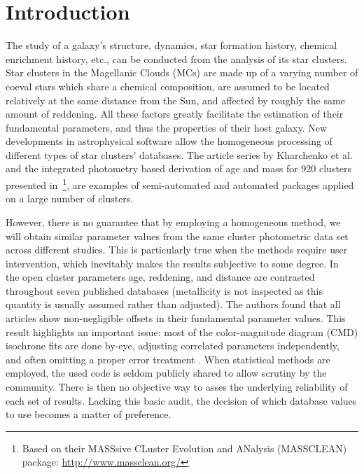 \documentclass{aa}
\begin{document}

\maketitle
%

\section{Introduction}
\label{sec:intro}

The study of a galaxy's structure, dynamics, star formation history, chemical
enrichment history, etc., can be conducted from the analysis of its star
clusters.
Star clusters in the Magellanic Clouds (MCs) are made up of a varying number of
coeval stars which share a chemical composition, are assumed to be located
relatively at the same distance from the Sun, and affected by roughly the same
amount of reddening. All these factors greatly facilitate the estimation of
their fundamental parameters, and thus the properties of their host galaxy.
%
New developments in astrophysical software allow the homogeneous
processing of different types of star clusters' databases. The article series
by Kharchenko et al. 
\citep[see][and references therein]{Kharchenko_2005,Schmeja_2014}
and the integrated photometry based derivation of age and mass for 920 clusters
presented
in~\cite{Popescu_2012}\footnote{Based on their MASSsive CLuster Evolution and
ANalysis (MASSCLEAN) package: \url{http://www.massclean.org/}}, are examples of
semi-automated and automated packages applied on a large number of clusters.

However, there is no guarantee that by employing a homogeneous method, we will
obtain similar parameter values from the same cluster photometric
data set across different studies. This is particularly true when the methods
require user intervention, which inevitably makes the results subjective to some
degree.
%
In~\cite{Netopil_2015} the open cluster parameters age, reddening, and distance
are contrasted throughout seven published databases (metallicity is not
inspected as this quantity is usually assumed rather than adjusted).
The authors found that all articles show non-negligible offsets in their
fundamental parameter values.
%
This result highlights an important issue: most of the color-magnitude diagram 
(CMD) isochrone fits are done by-eye, adjusting correlated parameters
independently, and often omitting a proper error treatment \citep[see]
[for a more detailed description of this problem]{vonHippel_2014}.
When statistical methods are employed, the used code is seldom publicly
shared to allow scrutiny by the community. There is then no objective way to
asses the underlying reliability of each set of results.
Lacking this basic audit, the decision of which database values to use
becomes a matter of preference.
\end{document}
